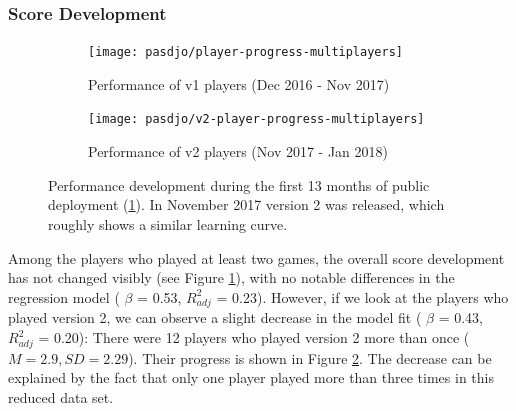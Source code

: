 \subsubsection{Score Development}
\begin{figure}[htbp]
	\begin{subfigure}[t]{0.49\linewidth}
		\texttt{[image: pasdjo/player-progress-multiplayers]}
		\caption{\label{fig:pasdjo:1y-progress}Performance of v1 players (Dec 2016 - Nov 2017)}
	\end{subfigure}
	\begin{subfigure}[t]{0.49\linewidth}
		\texttt{[image: pasdjo/v2-player-progress-multiplayers]}
		\caption{\label{fig:pasdjo:v2-progress}Performance of v2 players (Nov 2017 - Jan 2018)}
	\end{subfigure}
	\caption{\label{fig:pasdjo:v2-progess-comparison} Performance development during the first 13 months of public deployment (\ref{fig:pasdjo:1y-progress}). In November 2017 version 2 was released, which roughly shows a similar learning curve.}
\end{figure}
Among the players who played at least two games, the overall score development has not changed visibly (see Figure \ref{fig:pasdjo:1y-progress}), with no notable differences in the regression model 
( $\beta$ = 0.53, $R^2_{adj}$ = 0.23). However, if we look at the players who played version 2, we can observe a slight decrease in the model fit ( $\beta$ = 0.43, $R^2_{adj}$ = 0.20): There were 12 players who played version 2 more than once ($M=2.9, SD=2.29$). Their progress is shown in Figure \ref{fig:pasdjo:v2-progress}. The decrease can be explained by the fact that only one player played more than three times in this reduced data set. %


